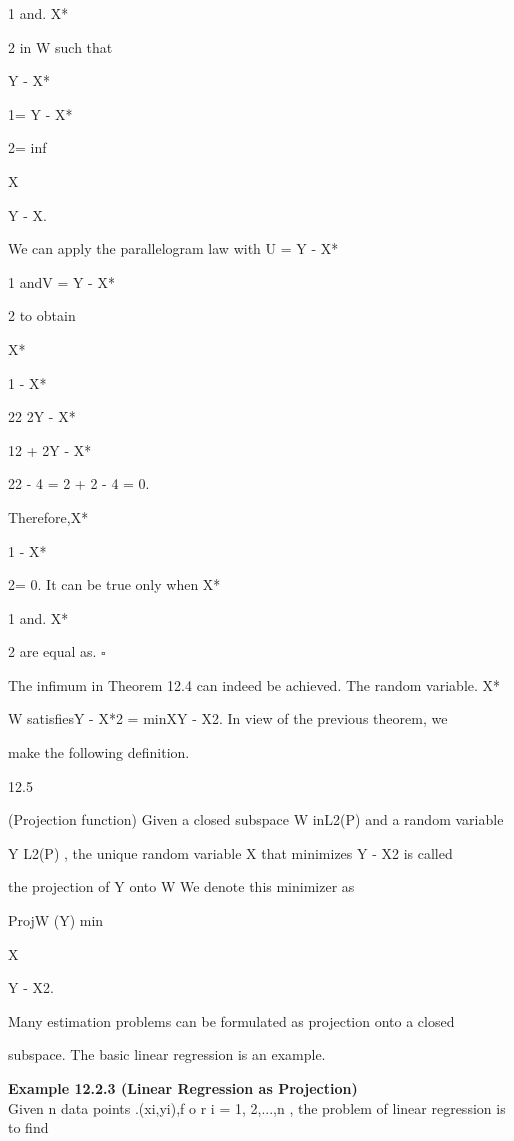 1 and. X*

2 in W such that

Y - X*

1= Y - X*

2= inf

X\inW

Y - X\coloneqq\alpha.

We can apply the parallelogram law with U = Y - X*

1 andV = Y - X*

2 to obtain

X*

1 - X*

22 \leq 2Y - X*

12 + 2Y - X*

22 - 4 = 2 + 2 - 4 = 0.

Therefore,X*

1 - X*

2= 0. It can be true only when X*

1 and. X*

2 are equal as. \hfill $\square$

The infimum in Theorem 12.4 can indeed be achieved. The random variable. X* \in

W satisfiesY - X*2 = minX\inW Y - X2. In view of the previous theorem, we

make the following definition.

\begin{defbox}{12.5}
\end{defbox}

(Projection function) Given a closed subspace W inL2(P) and a random variable

Y \in L2(P) , the unique random variable X that minimizes Y - X2 is called

the projection of Y onto W We denote this minimizer as

ProjW (Y) \coloneqqarg min

X\inW

Y - X2.

Many estimation problems can be formulated as projection onto a closed

subspace. The basic linear regression is an example.

\textbf{Example 12.2.3 (Linear Regression as Projection)} \\

Given n data points .(xi,yi),f o r i = 1, 2,...,n , the problem of linear regression is to find

